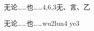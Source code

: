 \begin{entry}{无论……也……}{4,6,3}{⽆、⾔、⼄}
  \begin{phonetics}{无论……也……}{wu2lun4 ye3}
  \end{phonetics}
\end{entry}
